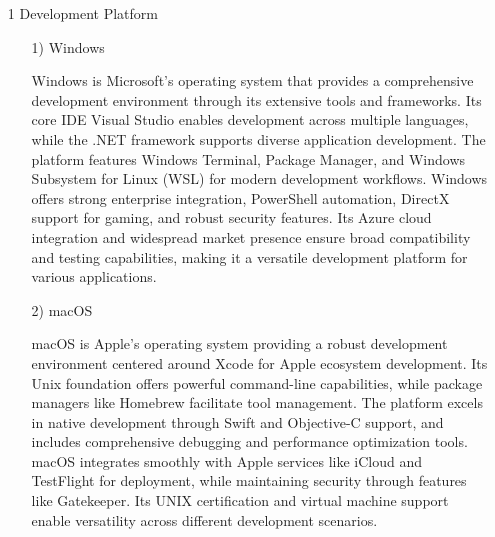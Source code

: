 \documentclass[conference]{IEEEtran}
\begin{document}
\begin{enumerate}
    \item[1] Development Platform\par
    \vspace{0.3em}
    
    \begin{itemize}
        \item [1)] Windows\par
        \vspace{0.3em}
        Windows is Microsoft's operating system that provides a comprehensive development environment through its extensive tools and frameworks. Its core IDE Visual Studio enables development across multiple languages, while the .NET framework supports diverse application development. The platform features Windows Terminal, Package Manager, and Windows Subsystem for Linux (WSL) for modern development workflows. Windows offers strong enterprise integration, PowerShell automation, DirectX support for gaming, and robust security features. Its Azure cloud integration and widespread market presence ensure broad compatibility and testing capabilities, making it a versatile development platform for various applications.

        \vspace{1em}
        
        \item [2)] macOS\par
        \vspace{0.3em}
        macOS is Apple's operating system providing a robust development environment centered around Xcode for Apple ecosystem development. Its Unix foundation offers powerful command-line capabilities, while package managers like Homebrew facilitate tool management. The platform excels in native development through Swift and Objective-C support, and includes comprehensive debugging and performance optimization tools. macOS integrates smoothly with Apple services like iCloud and TestFlight for deployment, while maintaining security through features like Gatekeeper. Its UNIX certification and virtual machine support enable versatility across different development scenarios.
    \end{itemize}
\end{enumerate}

\vspace{1em}
\end{document}
